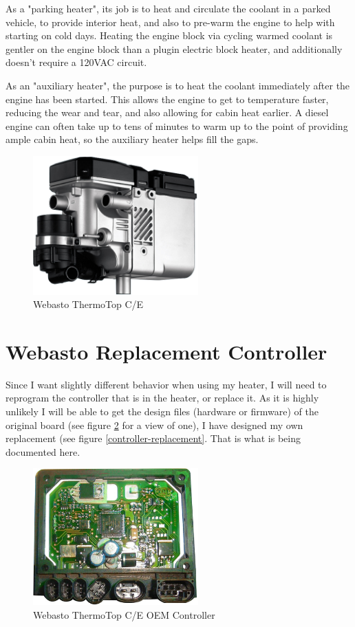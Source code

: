\documentclass[lettersize,journal]{IEEEtran}
\begin{document}
As a "parking heater", its job is to heat and circulate the coolant in a parked vehicle, to provide interior heat, and also to pre-warm the engine to help with starting on cold days.  Heating the engine block via cycling warmed coolant is gentler on the engine block than a plugin electric block heater, and additionally doesn't require a 120VAC circuit.

As an "auxiliary heater", the purpose is to heat the coolant immediately after the engine has been started.  This allows the engine to get to temperature faster, reducing the wear and tear, and also allowing for cabin heat earlier.  A diesel engine can often take up to tens of minutes to warm up to the point of providing ample cabin heat, so the auxiliary heater helps fill the gaps.

\begin{figure}[!t]
\centering
\includegraphics[width=2.5in,keepaspectratio]{Thermo-Top-C-E.png}
\caption{Webasto ThermoTop C/E}
\label{webasto-stock}
\end{figure}


\section{Webasto Replacement Controller}

\noindent Since I want slightly different behavior when using my heater, I will need to reprogram the controller that is in the heater, or replace it.  As it is highly unlikely I will be able to get the design files (hardware or firmware) of the original board (see figure \ref{controller-orig} for a view of one), I have designed my own replacement (see figure \ref{controller-replacement}.  That is what is being documented here.

\begin{figure}[!t]
\centering
\includegraphics[width=2.5in,keepaspectratio]{mainboard-orig.png}
\caption{Webasto ThermoTop C/E OEM Controller}
\label{controller-orig}
\end{figure}
\end{document}
